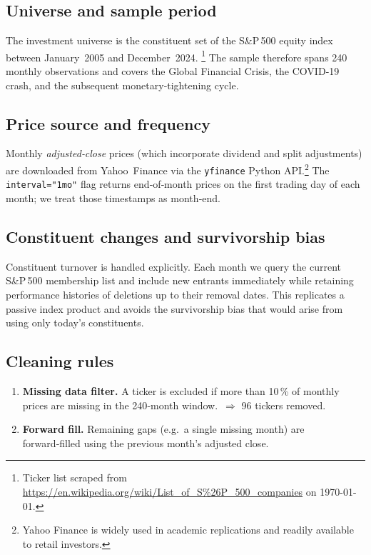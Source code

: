 \documentclass[11pt]{article}
\begin{document}
\subsection{Universe and sample period}

The investment universe is the constituent set of the S\&P\,500 equity index between January~2005 and December~2024.%
\footnote{Ticker list scraped from \url{https://en.wikipedia.org/wiki/List_of_S\%26P_500_companies} on \today.}
The sample therefore spans 240 monthly observations and covers the Global Financial Crisis, the COVID‐19 crash, and the subsequent monetary‑tightening cycle.

\subsection{Price source and frequency}

Monthly \emph{adjusted‐close} prices (which incorporate dividend and split adjustments) are downloaded from Yahoo Finance via the \texttt{yfinance} Python API.\footnote{Yahoo Finance is widely used in academic replications and readily available to retail investors.}
The \texttt{interval="1mo"} flag returns end‑of‑month prices on the first trading day of each month; we treat those timestamps as month‑end.

\subsection{Constituent changes and survivorship bias}

Constituent turnover is handled explicitly.  
Each month we query the current S\&P\,500 membership list and include new entrants immediately while retaining performance histories of deletions up to their removal dates.  
This replicates a passive index product and avoids the survivorship bias that would arise from using only today’s constituents.

\subsection{Cleaning rules}

\begin{enumerate}[label=(\alph*)]
  \item \textbf{Missing data filter.}  A ticker is excluded if more than 10 \% of monthly prices are missing in the 240‑month window.\ $
    \Rightarrow$ 96 tickers removed.  
  \item \textbf{Forward fill.}  Remaining gaps (e.g.\ a single missing month) are forward‑filled using the previous month’s adjusted close.  
\end{enumerate}
\end{document}
